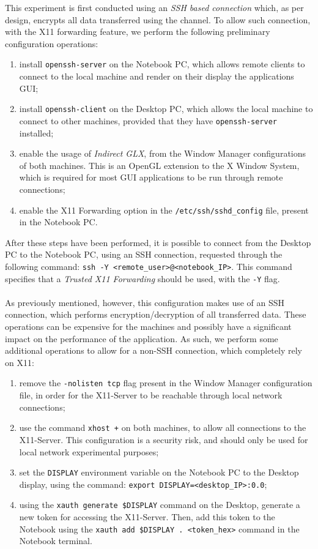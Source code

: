 This experiment is first conducted using an \textit{SSH based connection} which, as per design, encrypts all data transferred using the channel. To allow such connection, with the X11 forwarding feature, we perform the following preliminary configuration operations:
\begin{enumerate}
	\item install \texttt{openssh-server} on the Notebook PC, which allows remote clients to connect to the local machine and render on their display the applications GUI;
	\item install \texttt{openssh-client} on the Desktop PC, which allows the local machine to connect to other machines, provided that they have \texttt{openssh-server} installed;
	\item enable the usage of \textit{Indirect GLX}, from the Window Manager configurations of both machines. This is an OpenGL extension to the X Window System, which is required for most GUI applications to be run through remote connections;
	\item enable the X11 Forwarding option in the \texttt{/etc/ssh/sshd\_config} file, present in the Notebook PC.
\end{enumerate}
After these steps have been performed, it is possible to connect from the Desktop PC to the Notebook PC, using an SSH connection, requested through the following command: \texttt{ssh -Y <remote\_user>@<notebook\_IP>}. This command specifies that a \textit{Trusted X11 Forwarding} should be used, with the \texttt{-Y} flag. \\ \\
As previously mentioned, however, this configuration makes use of an SSH connection, which performs encryption/decryption of all transferred data. These operations can be expensive for the machines and possibly have a significant impact on the performance of the application. As such, we perform some additional operations to allow for a non-SSH connection, which completely rely on X11:
\begin{enumerate}
	\item remove the \texttt{-nolisten tcp} flag present in the Window Manager configuration file, in order for the X11-Server to be reachable through local network connections;
	\item use the command \texttt{xhost +} on both machines, to allow all connections to the X11-Server. This configuration is a security risk, and should only be used for local network experimental purposes;
	\item set the \texttt{DISPLAY} environment variable on the Notebook PC to the Desktop display, using the command: \texttt{export DISPLAY=<desktop\_IP>:0.0};
	\item using the \texttt{xauth generate \$DISPLAY} command on the Desktop, generate a new token for accessing the X11-Server. Then, add this token to the Notebook using the \texttt{xauth add \$DISPLAY . <token\_hex>} command in the Notebook terminal.
\end{enumerate}
